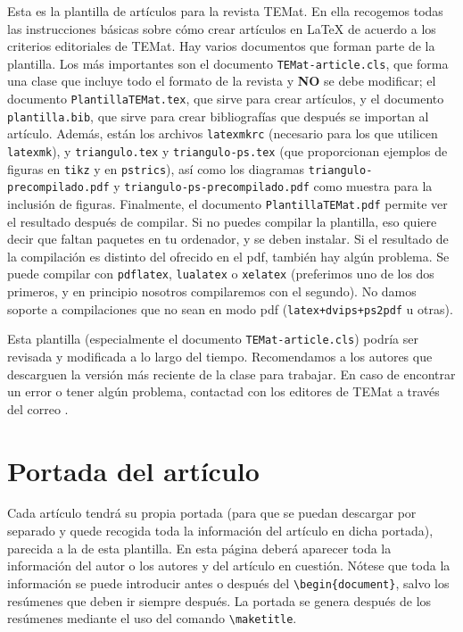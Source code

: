 \documentclass{TEMat-article}
\begin{document}
Esta es la plantilla de artículos para la revista TEMat.
En ella recogemos todas las instrucciones básicas sobre cómo crear artículos en \LaTeX{} de acuerdo a los criterios editoriales de TEMat.
Hay varios documentos que forman parte de la plantilla.
Los más importantes son el documento \verb+TEMat-article.cls+, que forma una clase que incluye todo el formato de la revista y \textbf{NO} se debe modificar; el documento \verb+PlantillaTEMat.tex+, que sirve para crear artículos, y el documento \verb+plantilla.bib+, que sirve para crear bibliografías que después se importan al artículo.
Además, están los archivos \verb+latexmkrc+ (necesario para los que utilicen \verb+latexmk+), y \verb+triangulo.tex+ y \verb+triangulo-ps.tex+ (que proporcionan ejemplos de figuras en \verb+tikz+ y en \verb+pstrics+), así como los diagramas \verb+triangulo-precompilado.pdf+ y \verb+triangulo-ps-precompilado.pdf+ como muestra para la inclusión de figuras.
Finalmente, el documento \verb+PlantillaTEMat.pdf+ permite ver el resultado después de compilar.
Si no puedes compilar la plantilla, eso quiere decir que faltan paquetes en tu ordenador, y se deben instalar.
Si el resultado de la compilación es distinto del ofrecido en el pdf, también hay algún problema.
Se puede compilar con \verb+pdflatex+, \verb+lualatex+ o \verb+xelatex+ (preferimos uno de los dos primeros, y en principio nosotros compilaremos con el segundo).
No damos soporte a compilaciones que no sean en modo pdf (\verb|latex+dvips+ps2pdf| u otras).

Esta plantilla (especialmente el documento \verb+TEMat-article.cls+) podría ser revisada y modificada a lo largo del tiempo.
Recomendamos a los autores que descarguen la versión más reciente de la clase para trabajar.
En caso de encontrar un error o tener algún problema, contactad con los editores de TEMat a través del correo .

\section{Portada del artículo}

Cada artículo tendrá su propia portada (para que se puedan descargar por separado y quede recogida toda la información del artículo en dicha portada), parecida a la de esta plantilla.
En esta página deberá aparecer toda la información del autor o los autores y del artículo en cuestión.
Nótese que toda la información se puede introducir antes o después del \verb+\begin{document}+, salvo los resúmenes que deben ir siempre después.
La portada se genera después de los resúmenes mediante el uso del comando \verb+\maketitle+.
\end{document}

